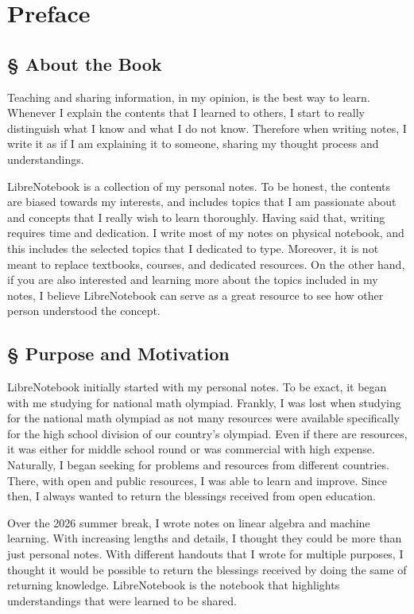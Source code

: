 \documentclass[../main.tex]{subfiles}
\begin{document}
\chapter*{Preface}

\section*{\S\! About the Book}

Teaching and sharing information, in my opinion, is the best way to
learn. Whenever I explain the contents that I learned to others,
I start to really distinguish what I know and what I do not know.
Therefore when writing notes, I write it as if I am explaining it to
someone, sharing my thought process and understandings.

LibreNotebook is a collection of my personal notes. To be honest,
the contents are biased towards my interests, and includes topics
that I am passionate about and concepts that I really wish to
learn thoroughly. Having said that, writing requires time and
dedication. I write most of my notes on physical notebook, and this
includes the selected topics that I dedicated to type. Moreover,
it is not meant to replace textbooks, courses, and dedicated
resources. On the other hand, if you are also interested and learning
more about the topics included in my notes, I believe LibreNotebook
can serve as a great resource to see how other person understood
the concept.

\section*{\S\! Purpose and Motivation}

LibreNotebook initially started with my personal notes. To be exact,
it began with me studying for national math olympiad. Frankly,
I was lost when studying for the national math olympiad as not
many resources were available specifically for the high school
division of our country's olympiad. Even if there are resources,
it was either for middle school round or was commercial with high
expense. Naturally, I began seeking for problems and resources from
different countries. There, with open and public resources, I was able
to learn and improve. Since then, I always wanted to return the
blessings received from open education.

Over the 2026 summer break, I wrote notes on linear algebra and
machine learning. With increasing lengths and details, I thought they
could be more than just personal notes. With different handouts that I
wrote for multiple purposes, I thought it would be possible to return
the blessings received by doing the same of returning knowledge.
LibreNotebook is the notebook that highlights understandings that were
learned to be shared.
\end{document}
